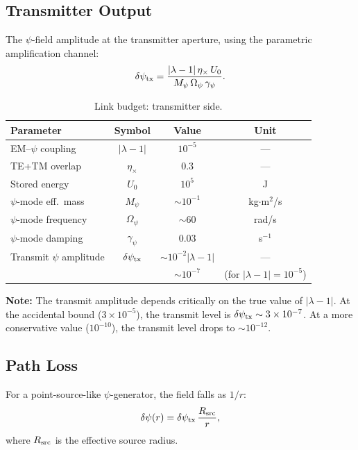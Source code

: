\documentclass[11pt,onecolumn]{article}
\begin{document}
\subsection{Transmitter Output}

The $\psi$-field amplitude at the transmitter aperture, using the
parametric amplification channel:
\begin{equation}
\delta\psi_{\rm tx} = \frac{|\lambda - 1|\,\eta_\times\,U_0}
{M_\psi\,\Omega_\psi\,\gamma_\psi}.
\end{equation}

\begin{table}[H]
\centering
\caption{Link budget: transmitter side.}
\label{tab:tx-budget}
\begin{tabular}{lccc}
\toprule
Parameter & Symbol & Value & Unit \\
\midrule
EM--$\psi$ coupling & $|\lambda - 1|$ & $10^{-5}$ & --- \\
TE+TM overlap & $\eta_\times$ & 0.3 & --- \\
Stored energy & $U_0$ & $10^5$ & J \\
$\psi$-mode eff.\ mass & $M_\psi$ & $\sim 10^{-1}$ & kg$\cdot$m$^2$/s \\
$\psi$-mode frequency & $\Omega_\psi$ & $\sim 60$ & rad/s \\
$\psi$-mode damping & $\gamma_\psi$ & 0.03 & s$^{-1}$ \\
\midrule
Transmit $\psi$ amplitude & $\delta\psi_{\rm tx}$ & $\sim 10^{-2} |\lambda-1|$ & --- \\
 & & $\sim 10^{-7}$ & (for $|\lambda-1|=10^{-5}$) \\
\bottomrule
\end{tabular}
\end{table}

\textbf{Note:} The transmit amplitude depends critically on the true
value of $|\lambda - 1|$.
At the accidental bound ($3 \times 10^{-5}$), the transmit level is
$\delta\psi_{\rm tx} \sim 3 \times 10^{-7}$.
At a more conservative value ($10^{-10}$), the transmit level drops to
$\sim 10^{-12}$.

\subsection{Path Loss}

For a point-source-like $\psi$-generator, the field falls as $1/r$:
\begin{equation}
\delta\psi(r) = \delta\psi_{\rm tx}\,\frac{R_{\rm src}}{r},
\end{equation}
where $R_{\rm src}$ is the effective source radius.
\end{document}
